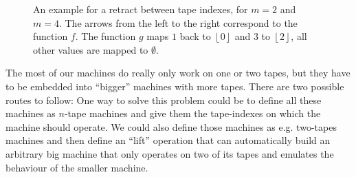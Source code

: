 \documentclass{psartcl}
\newcommand{\Some}[1]{\left\lfloor #1\right\rfloor}
\renewcommand{\None}{\emptyset}
\begin{document}
\begin{figure}
  \center
  \caption{An example for a retract between tape indexes, for $m=2$ and $m=4$.  The arrows from the left to the right correspond to the
  function $f$. The function $g$ maps $1$ back to $\Some{0}$ and $3$ to $\Some{2}$, all other values are mapped to $\None$.}
  \label{fig:m-n-lift-example-mapping}
\end{figure}

The most of our machines do really only work on one or two tapes, but they have to be embedded into ``bigger'' machines with more tapes.  There are
two possible routes to follow:  One way to solve this problem could be to define all these machines as $n$-tape machines and give them the
tape-indexes on which the machine should operate.  We could also define those machines as e.g. two-tapes machines and then define an ``lift''
operation that can automatically build an arbitrary big machine that only operates on two of its tapes and emulates the behaviour of the smaller
machine.
\end{document}
